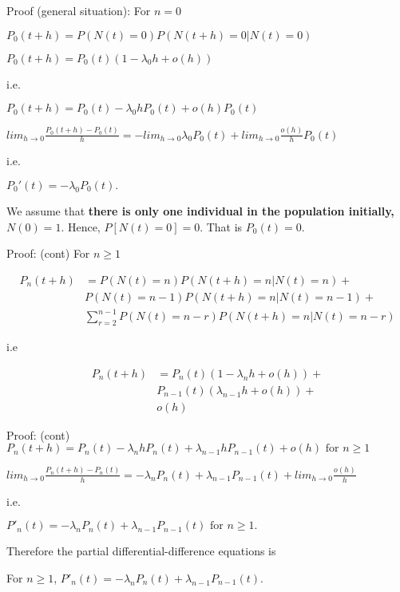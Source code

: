 \documentclass[12pt,ignorenonframetext,]{beamer}
\begin{document}
\begin{frame}{Proof (general situation):}
\protect\hypertarget{proof-general-situation}{}
For \(n=0\)

\(P_0(t+h)=P(N(t)=0)P(N(t+h)=0|N(t)=0)\)

\(P_0(t+h)=P_0(t)(1-\lambda_0 h + o(h))\)

i.e.

\(P_0(t+h)=P_0(t)-\lambda_0 h P_0(t) + o(h)P_0(t)\)

\(lim_{h \to 0}\frac{P_0(t+h)-P_0(t)}{h}= -lim_{h \to 0}\lambda_0 P_0(t) + lim_{h \to 0}\frac{o(h)}{h}P_0(t)\)

i.e.

\(P_0'(t)=-\lambda_0P_0(t).\)

We assume that \textbf{there is only one individual in the population
initially, \(N(0) = 1\)}. Hence, \(P[N(t) = 0] = 0\). That is
\(P_0(t)=0\).
\end{frame}

\begin{frame}{Proof: (cont)}
\protect\hypertarget{proof-cont}{}
For \(n \geq 1\)

\begin{align*}\label{eq:pareto mle1}
P_n(t+h) &=   P(N(t)=n)P(N(t+h)=n|N(t)=n) + \\
&P(N(t)=n-1)P(N(t+h)=n|N(t)=n-1) + \\
&\sum_{r=2}^{n-1}P(N(t)=n-r)P(N(t+h)=n|N(t)=n-r)
\end{align*}

i.e

\begin{align*}
P_n(t+h) &= P_n(t) (1-\lambda_n h + o(h))+\\
&P_{n-1}(t)(\lambda_{n-1} h + o(h))+ \\
& o(h)
\end{align*}
\end{frame}

\begin{frame}{Proof: (cont)}
\protect\hypertarget{proof-cont-1}{}
\(P_n(t+h)= P_n(t) -\lambda_n h P_n(t) + \lambda_{n-1}hP_{n-1}(t) + o(h) \text{ for } n\geq 1\)

\(lim_{h \to 0}\frac{P_n(t+h)-P_n(t)}{h}= -\lambda_n P_n(t) + \lambda_{n-1} P_{n-1}(t)+ lim_{h \to 0}\frac{o(h)}{h}\)

i.e.

\(P'_n(t) = -\lambda_n P_n(t) + \lambda_{n-1}P_{n-1}(t) \text{ for } n\geq 1.\)

Therefore the partial differential-difference equations is

For \(n \geq 1\),
\(P'_n(t) = -\lambda_n P_n(t) + \lambda_{n-1}P_{n-1}(t).\)
\end{frame}
\end{document}
